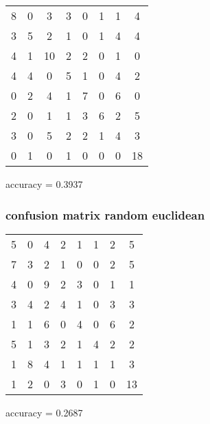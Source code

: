 \documentclass[12pt]{article}
\begin{document}
\begin{tabular}{c c c c c c c c}
     8 &     0 &     3 &     3 &     0 &     1 &     1 &     4 \\
     3 &     5 &     2 &     1 &     0 &     1 &     4 &     4 \\
     4 &     1 &    10 &     2 &     2 &     0 &     1 &     0 \\
     4 &     4 &     0 &     5 &     1 &     0 &     4 &     2 \\
     0 &     2 &     4 &     1 &     7 &     0 &     6 &     0 \\
     2 &     0 &     1 &     1 &     3 &     6 &     2 &     5 \\
     3 &     0 &     5 &     2 &     2 &     1 &     4 &     3 \\
     0 &     1 &     0 &     1 &     0 &     0 &     0 &    18 
\end{tabular}


accuracy = 0.3937

\subsubsection{confusion matrix random euclidean}

\begin{tabular}{c c c c c c c c}
     5 &     0 &     4 &     2 &     1 &     1 &     2 &     5 \\
     7 &     3 &     2 &     1 &     0 &     0 &     2 &     5 \\
     4 &     0 &     9 &     2 &     3 &     0 &     1 &     1 \\
     3 &     4 &     2 &     4 &     1 &     0 &     3 &     3 \\
     1 &     1 &     6 &     0 &     4 &     0 &     6 &     2 \\
     5 &     1 &     3 &     2 &     1 &     4 &     2 &     2 \\
     1 &     8 &     4 &     1 &     1 &     1 &     1 &     3 \\
     1 &     2 &     0 &     3 &     0 &     1 &     0 &    13 
\end{tabular}


accuracy = 0.2687
\end{document}
